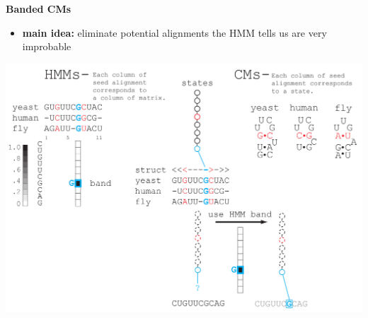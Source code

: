 \documentclass[landscape]{slides}
\begin{document}
\begin{slide}
\begin{center}
\large
\textbf{Banded CMs}
\end{center}
\medskip
\small
\begin{itemize}
\item
\textbf{main idea:} eliminate potential alignments the HMM tells us are very improbable
\end{itemize}
\begin{center}
\includegraphics[width=8in]{figs/post_hmm_to_cm_map2_layer13}
\end{center}
\vfill
\end{slide}
\end{document}
